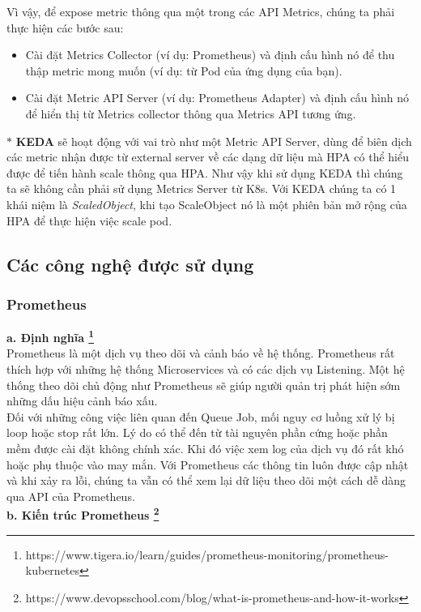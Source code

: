 Vì vậy, để expose metric thông qua một trong các API Metrics, chúng ta phải thực hiện các bước sau:
\begin{itemize}
    \item Cài đặt Metrics Collector (ví dụ: Prometheus) và định cấu hình nó để thu thập metric mong muốn (ví dụ: từ Pod của ứng dụng của bạn).
    \item Cài đặt Metric API Server (ví dụ: Prometheus Adapter) và định cấu hình nó để hiển thị từ Metrics collector thông qua Metrics API tương ứng.
\end{itemize}
$\ast$ \textbf{KEDA} sẽ hoạt động với vai trò như một Metric API Server, dùng để biên dịch các metric nhận được từ external server về các dạng dữ liệu mà HPA có thể hiểu được để tiến hành scale thông qua HPA. Như vậy khi sử dụng KEDA thì chúng ta sẽ không cần phải sử dụng Metrics Server từ K8s. Với KEDA chúng ta có 1 khái niệm là \textit{ScaledObject}, khi tạo ScaleObject nó là một phiên bản mở rộng của HPA để thực hiện việc scale pod.
\subsection{Các công nghệ được sử dụng}
\subsubsection{Prometheus}
\textbf{a. Định nghĩa \footnote{https://www.tigera.io/learn/guides/prometheus-monitoring/prometheus-kubernetes}}\\[0.5cm]
Prometheus là một dịch vụ theo dõi và cảnh báo về hệ thống. Prometheus rất thích hợp với những hệ thống Microservices và có các dịch vụ Listening. Một hệ thống theo dõi chủ động như Prometheus sẽ giúp người quản trị phát hiện sớm những dấu hiệu cảnh báo xấu.\\[0.5cm]
Đối với những công việc liên quan đến Queue Job, mối nguy cơ luồng xử lý bị loop hoặc stop rất lớn. Lý do có thể đến từ tài nguyên phần cứng hoặc phần mềm được cài đặt không chính xác. Khi đó việc xem log của dịch vụ đó rất khó hoặc phụ thuộc vào may mắn. Với Prometheus các thông tin luôn được cập nhật và khi xảy ra lỗi, chúng ta vẫn có thể xem lại dữ liệu theo dõi một cách dễ dàng qua API của Prometheus.\\[0.5cm]
\textbf{b. Kiến trúc Prometheus \footnote{https://www.devopsschool.com/blog/what-is-prometheus-and-how-it-works}}


